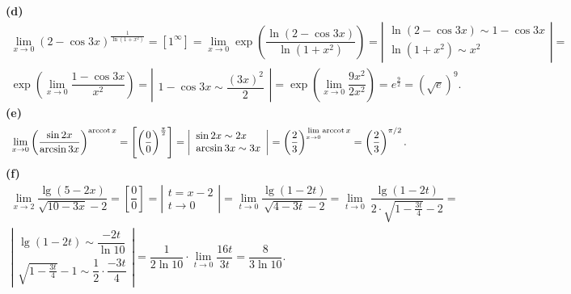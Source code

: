 \newpage
{\bf\flushleft (d)}
$$
\begin{array}{l}
\lim\limits_{x\rightarrow0}({2-\cos{3x}})^{\frac{1}{\ln{(1+x^2)}}} =
\left[1^{\infty}\right] =
\lim\limits_{x\rightarrow0}\exp\left(\dfrac{\ln(2-\cos{3x})}{\ln{(1+x^2)}}\right) =
\left|\begin{array}{l}
\ln(2-\cos{3x})\sim 1-\cos{3x} \\
\ln(1+x^2)\sim x^2
\end{array}\right| = \\[16pt]
\exp\left(\lim\limits_{x\rightarrow0}\dfrac{1-\cos{3x}}{x^2}\right) = 
\left|\begin{array}{l}
1-\cos{3x}\sim \dfrac{(3x)^2}{2}
\end{array}\right| = 
\exp\left(\lim\limits_{x\rightarrow0}\dfrac{9x^2}{2x^2}\right) =
e^{\frac{9}{2}} = (\sqrt{e})^9.
\end{array}
$$
\vspace{0.2cm}
{\bf\flushleft (e)}
$$
\begin{array}{l}
\lim\limits_{x\rightarrow0}{\left(\dfrac{\sin{2x}}{\arcsin{3x}}\right)}^{\operatorname{arccot} x} =
\left[\left(\dfrac{0}{0}\right)^{\frac{\pi}{2}}\right] =
\left|\begin{array}{l}
\sin{2x}\sim 2x \\
\arcsin{3x}\sim 3x
\end{array}\right| =
\left(\dfrac{2}{3}\right)^{\lim\limits_{x\rightarrow0}\operatorname{arccot} x} =
\left(\dfrac{2}{3}\right)^{\pi/2}.
\end{array}
$$
\vspace{0.2cm}
{\bf\flushleft (f)}
$$
\begin{array}{l}
\lim\limits_{x\rightarrow2}\dfrac{\lg{(5-2x)}}{\sqrt{10-3x}-2} =
\left[\dfrac{0}{0}\right] =
\left|\begin{array}{l}
t=x-2 \\
t\rightarrow0
\end{array}\right| =
\lim\limits_{t\rightarrow0}\dfrac{\lg{(1-2t)}}{\sqrt{4-3t}-2} =
\lim\limits_{t\rightarrow0}\ \dfrac{\lg{(1-2t)}}{2\cdot\sqrt{1-\frac{3t}{4}}-2} = \\ [15pt]
\left|\begin{array}{l}
\lg{(1-2t)}\sim \dfrac{-2t}{\ln{10}} \\ [10pt]
\sqrt{1-\frac{3t}{4}}-1\sim \dfrac{1}{2}\cdot\dfrac{-3t}{4}
\end{array}\right| =
\dfrac{1}{2\ln{10}}\cdot\lim\limits_{t\rightarrow0}\dfrac{16t}{3t} = \dfrac{8}{3\ln{10}}.
\end{array}
$$

